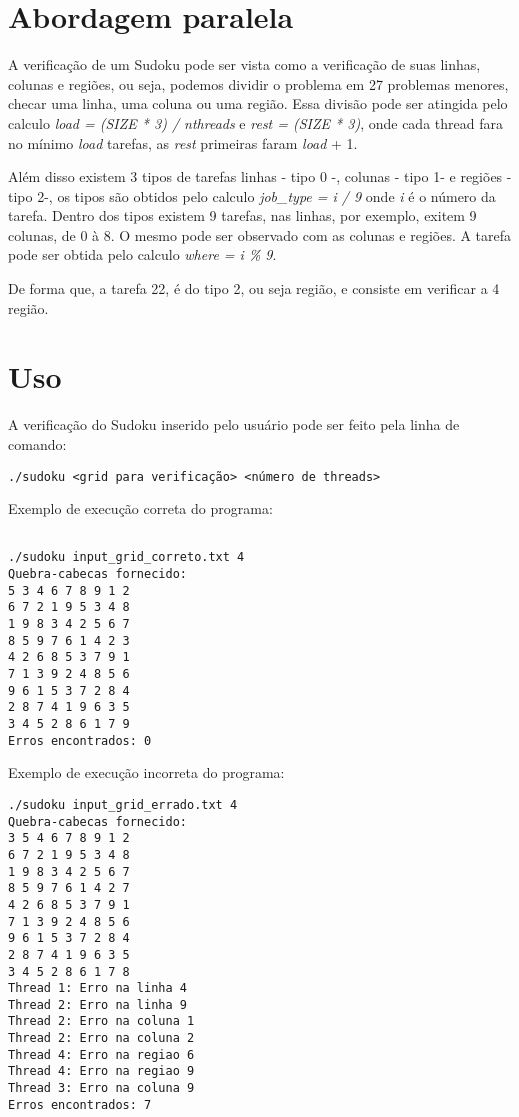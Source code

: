 \documentclass[a4paper, 12pt]{article}
\begin{document}
\section{Abordagem paralela}
A verificação de um Sudoku pode ser vista como a verificação de suas linhas,
colunas e regiões, ou seja, podemos dividir o problema em 27 problemas menores,
checar uma linha, uma coluna ou uma região.
Essa divisão pode ser atingida pelo calculo \textit{load = (SIZE * 3) / nthreads} e
\textit{rest = (SIZE * 3)}, onde cada thread fara no mínimo \textit{load} tarefas,
as \textit{rest} primeiras faram \textit{load} + 1.
\par
Além disso existem 3 tipos de tarefas linhas - tipo 0 -, colunas - tipo 1-  e
regiões - tipo 2-, os tipos são obtidos pelo calculo \textit{job\_type = i / 9}
onde \textit{i} é o número da tarefa. Dentro dos tipos existem 9 tarefas, nas
linhas, por exemplo, exitem 9 colunas, de 0 à 8. O mesmo pode ser observado com
as colunas e regiões. A tarefa pode ser obtida pelo calculo \textit{where = i \% 9}.
\par
De forma que, a tarefa 22, é do tipo 2, ou seja região, e consiste em verificar
a 4 região.


\section{Uso}

A verificação do Sudoku inserido pelo usuário pode ser feito pela linha de comando:
\begin{verbatim}
./sudoku <grid para verificação> <número de threads>
\end{verbatim}

Exemplo de execução correta do programa:

\begin{verbatim}

./sudoku input_grid_correto.txt 4
Quebra-cabecas fornecido:
5 3 4 6 7 8 9 1 2
6 7 2 1 9 5 3 4 8
1 9 8 3 4 2 5 6 7
8 5 9 7 6 1 4 2 3
4 2 6 8 5 3 7 9 1
7 1 3 9 2 4 8 5 6
9 6 1 5 3 7 2 8 4
2 8 7 4 1 9 6 3 5
3 4 5 2 8 6 1 7 9
Erros encontrados: 0
\end{verbatim}

Exemplo de execução incorreta do programa:

\begin{verbatim}
./sudoku input_grid_errado.txt 4
Quebra-cabecas fornecido:
3 5 4 6 7 8 9 1 2
6 7 2 1 9 5 3 4 8
1 9 8 3 4 2 5 6 7
8 5 9 7 6 1 4 2 7
4 2 6 8 5 3 7 9 1
7 1 3 9 2 4 8 5 6
9 6 1 5 3 7 2 8 4
2 8 7 4 1 9 6 3 5
3 4 5 2 8 6 1 7 8
Thread 1: Erro na linha 4
Thread 2: Erro na linha 9
Thread 2: Erro na coluna 1
Thread 2: Erro na coluna 2
Thread 4: Erro na regiao 6
Thread 4: Erro na regiao 9
Thread 3: Erro na coluna 9
Erros encontrados: 7
\end{verbatim}
\end{document}
